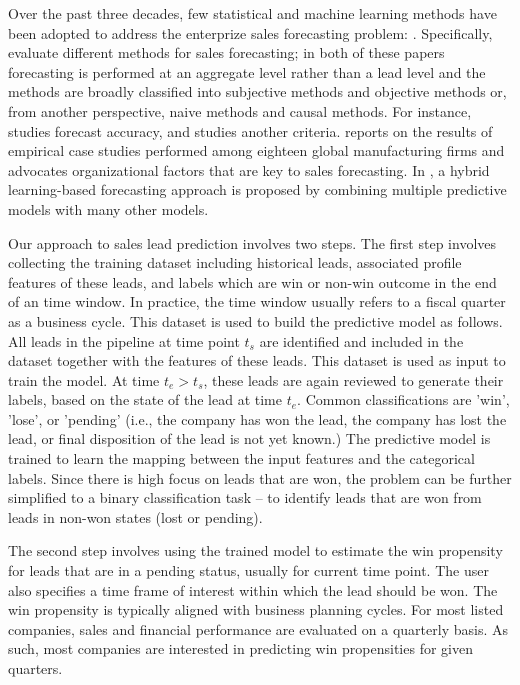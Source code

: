 \documentclass[10pt,conference]{IEEEtran}
\begin{document}
Over the past three decades, few statistical and machine learning methods have been adopted to address the enterprize sales forecasting problem: \cite{armstrong1972comparative,yokuma1995beyond,davis2007organizational,lee2012hybrid}. Specifically, \cite{armstrong1972comparative,yokuma1995beyond} evaluate different methods for sales forecasting; in both of these papers forecasting is performed at an aggregate level rather than a lead level and the methods are broadly classified into subjective methods and objective methods or, from another perspective, naive methods and causal methods. For instance, \cite{armstrong1972comparative} studies forecast accuracy, and \cite{yokuma1995beyond} studies another criteria. \cite{davis2007organizational} reports on the results of empirical case studies performed among eighteen global manufacturing firms and advocates organizational factors that are key to sales forecasting. In \cite{lee2012hybrid}, a hybrid learning-based forecasting approach is proposed by combining multiple predictive models with many other models.

Our approach to sales lead prediction involves two steps. The first step involves collecting the training dataset including historical leads, associated profile features of these leads, and labels which are win or non-win outcome in the end of an time window. In practice, the time window usually refers to a fiscal quarter as a business cycle. This dataset is used to build the predictive model as follows. All leads in the pipeline at time point $t_s$ are identified and included in the dataset together with the features of these leads. This dataset is used as input to train the model. At time $t_e>t_s$, these leads are again reviewed to generate their labels, based on the state of the lead at time $t_e$. Common classifications are 'win', 'lose', or 'pending' (i.e., the company has won the lead, the company has lost the lead, or final disposition of the lead is not yet known.) The predictive model is trained to learn the mapping between the input features and the categorical labels. Since there is high focus on leads that are won, the problem can be further simplified to a binary classification task -- to identify leads that are won from leads in non-won states (lost or pending).

The second step involves using the trained model to estimate the win propensity for leads that are in a pending status, usually for current time point. The user also specifies a time frame of interest within which the lead should be won. The win propensity is typically aligned with business planning cycles. For most listed companies, sales and financial performance are evaluated on a quarterly basis. As such, most companies are interested in predicting win propensities for given quarters.
\end{document}
